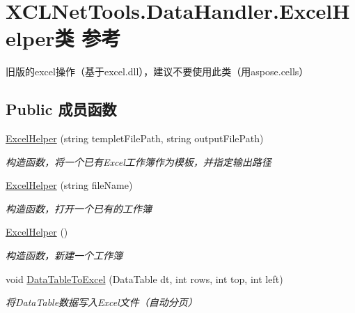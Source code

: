\hypertarget{class_x_c_l_net_tools_1_1_data_handler_1_1_excel_helper}{\section{X\-C\-L\-Net\-Tools.\-Data\-Handler.\-Excel\-Helper类 参考}
\label{class_x_c_l_net_tools_1_1_data_handler_1_1_excel_helper}
}


旧版的excel操作（基于excel.\-dll），建议不要使用此类（用aspose.\-cells）  


\subsection*{Public 成员函数}
\begin{DoxyCompactItemize}
\item 
\hyperlink{class_x_c_l_net_tools_1_1_data_handler_1_1_excel_helper_acebffd827fa8842be172440be3e1a134}{Excel\-Helper} (string templet\-File\-Path, string output\-File\-Path)
\begin{DoxyCompactList}\small\item\em 构造函数，将一个已有\-Excel工作簿作为模板，并指定输出路径 \end{DoxyCompactList}\item 
\hyperlink{class_x_c_l_net_tools_1_1_data_handler_1_1_excel_helper_a7b0a4d5a5f8509b97ed054db15ef23d2}{Excel\-Helper} (string file\-Name)
\begin{DoxyCompactList}\small\item\em 构造函数，打开一个已有的工作簿 \end{DoxyCompactList}\item 
\hyperlink{class_x_c_l_net_tools_1_1_data_handler_1_1_excel_helper_a2a3ce10ddfb59e2560a8faa05abc9976}{Excel\-Helper} ()
\begin{DoxyCompactList}\small\item\em 构造函数，新建一个工作簿 \end{DoxyCompactList}\item 
void \hyperlink{class_x_c_l_net_tools_1_1_data_handler_1_1_excel_helper_aee0dd3e95ba5e89b2043cb7d1c969a1c}{Data\-Table\-To\-Excel} (Data\-Table dt, int rows, int top, int left)
\begin{DoxyCompactList}\small\item\em 将\-Data\-Table数据写入\-Excel文件（自动分页） \end{DoxyCompactList}\item 

\end{DoxyCompactItemize}
